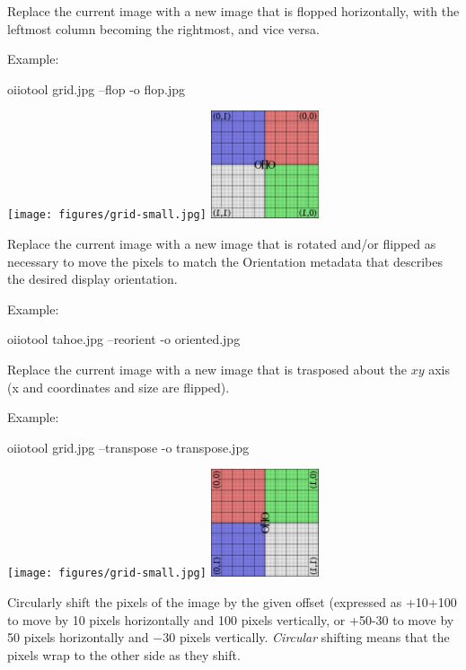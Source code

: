 Replace the current image with a new image that is flopped horizontally,
with the leftmost column becoming the rightmost, and vice versa.

\noindent Example:
\begin{code}
    oiiotool grid.jpg --flop -o flop.jpg
\end{code}
\spc \texttt{[image: figures/grid-small.jpg]} 
\raisebox{40pt}{\large $\rightarrow$}
\includegraphics[width=1.25in]{figures/flop.jpg} \\
\apiend

Replace the current image with a new image that is rotated and/or flipped
as necessary to move the pixels to match the Orientation metadata
that describes the desired display orientation.

\noindent Example:
\begin{code}
    oiiotool tahoe.jpg --reorient -o oriented.jpg
\end{code}
\apiend

Replace the current image with a new image that is trasposed about
the $xy$ axis (x and coordinates and size are flipped).

\noindent Example:
\begin{code}
    oiiotool grid.jpg --transpose -o transpose.jpg
\end{code}
\spc \texttt{[image: figures/grid-small.jpg]} 
\raisebox{40pt}{\large $\rightarrow$}
\includegraphics[width=1.25in]{figures/transpose.jpg} \\
\apiend

Circularly shift the pixels of the image by the given offset (expressed
as {\cf +10+100} to move by 10 pixels horizontally and 100 pixels
vertically, or {\cf +50-30} to move by 50 pixels horizontally and
$-30$ pixels vertically.  \emph{Circular} shifting means that the
pixels wrap to the other side as they shift.

